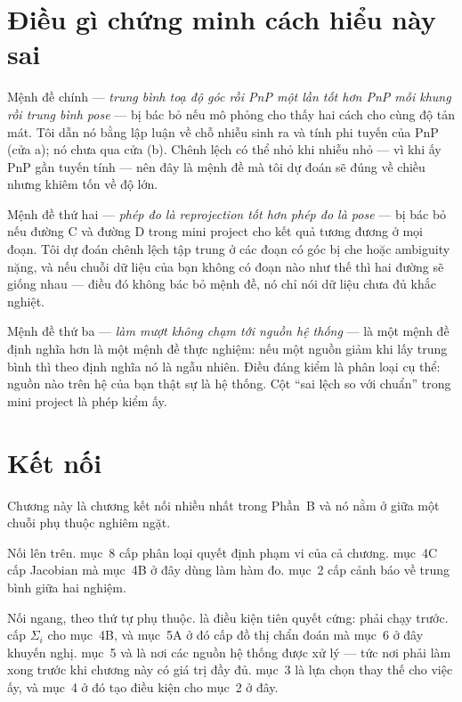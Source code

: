 \documentclass[../../marker.tex]{subfiles}
\begin{document}
\section{Điều gì chứng minh cách hiểu này sai}

Mệnh đề chính --- \emph{trung bình toạ độ góc rồi PnP một lần tốt hơn PnP mỗi khung rồi trung bình pose} --- bị bác bỏ nếu mô phỏng cho thấy hai cách cho cùng độ tản mát. Tôi dẫn nó bằng lập luận về chỗ nhiễu sinh ra và tính phi tuyến của PnP (cửa a); nó chưa qua cửa (b). Chênh lệch có thể nhỏ khi nhiễu nhỏ --- vì khi ấy PnP gần tuyến tính --- nên đây là mệnh đề mà tôi dự đoán sẽ đúng về chiều nhưng khiêm tốn về độ lớn.

Mệnh đề thứ hai --- \emph{phép đo là reprojection tốt hơn phép đo là pose} --- bị bác bỏ nếu đường C và đường D trong mini project cho kết quả tương đương ở mọi đoạn. Tôi dự đoán chênh lệch tập trung ở các đoạn có góc bị che hoặc ambiguity nặng, và nếu chuỗi dữ liệu của bạn không có đoạn nào như thế thì hai đường sẽ giống nhau --- điều đó không bác bỏ mệnh đề, nó chỉ nói dữ liệu chưa đủ khắc nghiệt.

Mệnh đề thứ ba --- \emph{làm mượt không chạm tới nguồn hệ thống} --- là một mệnh đề định nghĩa hơn là một mệnh đề thực nghiệm: nếu một nguồn giảm khi lấy trung bình thì theo định nghĩa nó là ngẫu nhiên. Điều đáng kiểm là phân loại cụ thể: nguồn nào trên hệ của bạn thật sự là hệ thống. Cột ``sai lệch so với chuẩn'' trong mini project là phép kiểm ấy.

\section{Kết nối}

Chương này là chương kết nối nhiều nhất trong Phần~B và nó nằm ở giữa một chuỗi phụ thuộc nghiêm ngặt.

Nối lên trên.  mục~8 cấp phân loại quyết định phạm vi của cả chương.  mục~4C cấp Jacobian mà mục~4B ở đây dùng làm hàm đo.  mục~2 cấp cảnh báo về trung bình giữa hai nghiệm.

Nối ngang, theo thứ tự phụ thuộc.  là điều kiện tiên quyết cứng: phải chạy trước.  cấp \(\Sigma_i\) cho mục~4B, và mục~5A ở đó cấp đồ thị chẩn đoán mà mục~6 ở đây khuyến nghị.  mục~5 và  là nơi các nguồn hệ thống được xử lý --- tức nơi phải làm xong trước khi chương này có giá trị đầy đủ.  mục~3 là lựa chọn thay thế cho việc ấy, và mục~4 ở đó tạo điều kiện cho mục~2 ở đây.
\end{document}
